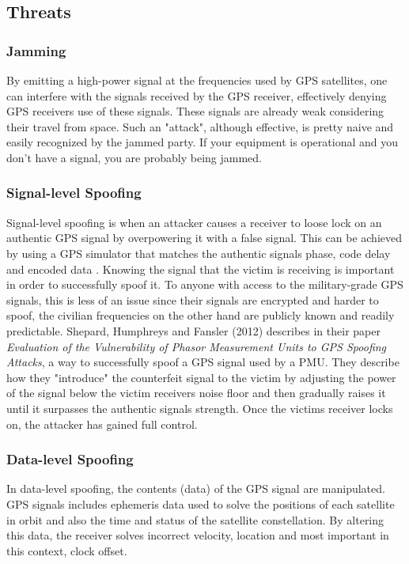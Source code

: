 \documentclass[12pt,english,a4paper]{article}
\begin{document}
\subsection{Threats}
\subsubsection{Jamming}\label{jam}
By emitting a high-power signal at the frequencies used by GPS satellites, one can interfere with the signals received by the GPS receiver, effectively denying GPS receivers use of these signals. These signals are already weak considering their travel from space. Such an "attack", although effective, is pretty naive and easily recognized by the jammed party. If your equipment is operational and you don't have a signal, you are probably being jammed.

\subsubsection{Signal-level Spoofing}\label{sls}
Signal-level spoofing is when an attacker causes a receiver to loose lock on an authentic GPS signal by overpowering it with a false signal. This can be achieved by using a GPS simulator that matches the authentic signals phase, code delay and encoded data \cite{SGRCOOPMU}. Knowing the signal that the victim is receiving is important in order to successfully spoof it. To anyone with access to the military-grade GPS signals, this is less of an issue since their signals are encrypted and harder to spoof, the civilian frequencies on the other hand are publicly known and readily predictable. Shepard, Humphreys and Fansler (2012)\cite{EVPMUGA} describes in their paper \textit{Evaluation of the Vulnerability of Phasor Measurement Units to GPS Spoofing Attacks}, a way to successfully spoof a GPS signal used by a PMU. They describe how they "introduce" the counterfeit signal to the victim by adjusting the power of the signal below the victim receivers noise floor and then gradually raises it until it surpasses the authentic signals strength. Once the victims receiver locks on, the attacker has gained full control.

\subsubsection{Data-level Spoofing}\label{dls}
In data-level spoofing, the contents (data) of the GPS signal are manipulated. GPS signals includes ephemeris data used to solve the positions of each satellite in orbit and also the time and status of the satellite constellation. By altering this data, the receiver solves incorrect velocity, location and most important in this context, clock offset.\cite{SGRCOOPMU}
\end{document}
